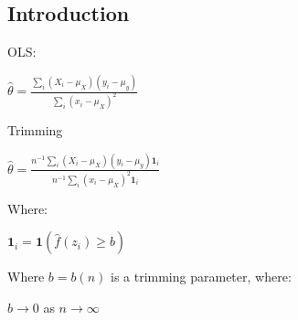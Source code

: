 
\subsection{Introduction}

OLS:

\(\hat \theta =\frac{\sum_i (X_i-\mu_X)(y_i-\mu_y)}{\sum_i(x_i-\mu_X)^2}\)

Trimming

\(\hat \theta =\frac{n^{-1}\sum_i (X_i-\mu_X)(y_i-\mu_y)\mathbf 1_i}{n^{-1}\sum_i(x_i-\mu_X)^2\mathbf 1_i}\)

Where:

\(\mathbf 1_i=\mathbf 1(\hat f(z_i)\ge b)\)

Where \(b=b(n)\) is a trimming parameter, where:

\(b\rightarrow 0\) as \(n\rightarrow \infty \)

